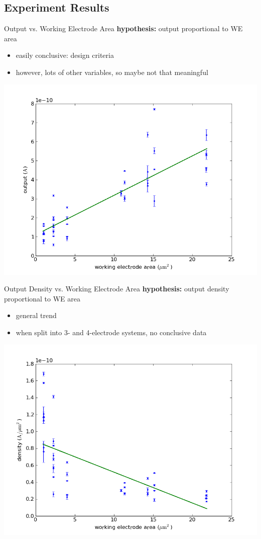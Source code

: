 \documentclass[10pt]{beamer}
\begin{document}
\subsection{Experiment Results}
\begin{frame}{Output vs. Working Electrode Area}
	\textbf{hypothesis:} output proportional to WE area
	\begin{itemize}
		\item easily conclusive: design criteria
		\item however, lots of other variables, so maybe not that meaningful
	\end{itemize}
	\includegraphics[width=0.8\linewidth]{figures/area_v_output.png}
\end{frame}

\begin{frame}{Output Density vs. Working Electrode Area}
	\textbf{hypothesis:} output density proportional to WE area
	\begin{itemize}
		\item general trend
		\item when split into 3- and 4-electrode systems, no conclusive data
	\end{itemize}
	\includegraphics[width=0.8\linewidth]{figures/area_v_density.png}
\end{frame}
\end{document}

